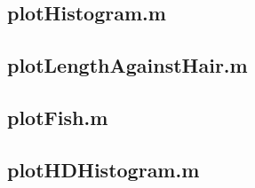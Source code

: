 \documentclass[10pt,a4paper]{article}
\begin{document}
\subsection{plotHistogram.m}\label{a:plotHistogram}

\subsection{plotLengthAgainstHair.m}\label{a:plotLengthAgainstHair}

\subsection{plotFish.m}\label{a:plotFish}

\subsection{plotHDHistogram.m}\label{a:plotHDHistogram}
\end{document}
